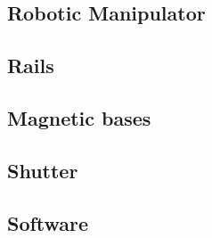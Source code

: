 \subsection{Robotic Manipulator}

\subsection{Rails}

\subsection{Magnetic bases}

\subsection{Shutter}

\subsection{Software}